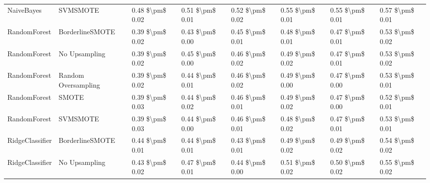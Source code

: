 \begin{tabular}{llllllll}
                     NaiveBayes &                      SVMSMOTE & 0.48 \$\textbackslash pm\$ 0.02 &           0.51 \$\textbackslash pm\$ 0.01 &       0.52 \$\textbackslash pm\$ 0.02 &        0.55 \$\textbackslash pm\$ 0.01 &                         0.55 \$\textbackslash pm\$ 0.01 &     0.57 \$\textbackslash pm\$ 0.01 \\
                   RandomForest &               BorderlineSMOTE & 0.39 \$\textbackslash pm\$ 0.02 &           0.43 \$\textbackslash pm\$ 0.00 &       0.45 \$\textbackslash pm\$ 0.01 &        0.48 \$\textbackslash pm\$ 0.01 &                         0.47 \$\textbackslash pm\$ 0.01 &     0.53 \$\textbackslash pm\$ 0.02 \\
                   RandomForest &                 No Upsampling & 0.39 \$\textbackslash pm\$ 0.02 &           0.45 \$\textbackslash pm\$ 0.00 &       0.46 \$\textbackslash pm\$ 0.02 &        0.49 \$\textbackslash pm\$ 0.02 &                         0.47 \$\textbackslash pm\$ 0.01 &     0.53 \$\textbackslash pm\$ 0.02 \\
                   RandomForest &           Random Oversampling & 0.39 \$\textbackslash pm\$ 0.02 &           0.44 \$\textbackslash pm\$ 0.01 &       0.46 \$\textbackslash pm\$ 0.02 &        0.49 \$\textbackslash pm\$ 0.00 &                         0.47 \$\textbackslash pm\$ 0.00 &     0.53 \$\textbackslash pm\$ 0.01 \\
                   RandomForest &                         SMOTE & 0.39 \$\textbackslash pm\$ 0.03 &           0.44 \$\textbackslash pm\$ 0.02 &       0.46 \$\textbackslash pm\$ 0.01 &        0.49 \$\textbackslash pm\$ 0.02 &                         0.47 \$\textbackslash pm\$ 0.00 &     0.52 \$\textbackslash pm\$ 0.01 \\
                   RandomForest &                      SVMSMOTE & 0.39 \$\textbackslash pm\$ 0.03 &           0.44 \$\textbackslash pm\$ 0.00 &       0.46 \$\textbackslash pm\$ 0.01 &        0.48 \$\textbackslash pm\$ 0.02 &                         0.47 \$\textbackslash pm\$ 0.01 &     0.53 \$\textbackslash pm\$ 0.01 \\
                RidgeClassifier &               BorderlineSMOTE & 0.44 \$\textbackslash pm\$ 0.01 &           0.44 \$\textbackslash pm\$ 0.01 &       0.43 \$\textbackslash pm\$ 0.01 &        0.49 \$\textbackslash pm\$ 0.02 &                         0.49 \$\textbackslash pm\$ 0.02 &     0.54 \$\textbackslash pm\$ 0.02 \\
                RidgeClassifier &                 No Upsampling & 0.43 \$\textbackslash pm\$ 0.02 &           0.47 \$\textbackslash pm\$ 0.01 &       0.44 \$\textbackslash pm\$ 0.00 &        0.51 \$\textbackslash pm\$ 0.02 &                         0.50 \$\textbackslash pm\$ 0.02 &     0.55 \$\textbackslash pm\$ 0.02 \\

\end{tabular}
